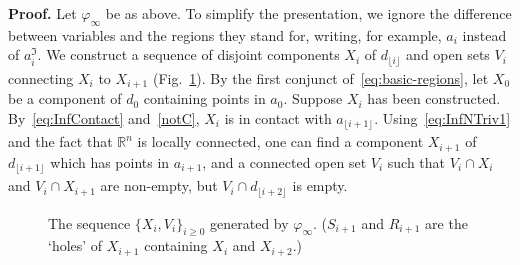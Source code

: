 \documentclass{article}
\newcommand{\R}{\mathbb{R}}
\newcommand{\md}[2][] {{\lfloor#2\rfloor_{#1}}}
\newcommand{\qedsymbol}{\ding{113}}
\newenvironment{proof}{\par\noindent\textbf{Proof.}}{\mbox{}\hfill\qedsymbol\par\bigskip}
\renewcommand{\phi}{\varphi}
\begin{document}
\begin{proof}
Let $\phi_\infty$ be as above.
To simplify the presentation, we ignore the difference between variables
and the regions they stand for, writing, for example, $a_i$ instead of
$a_i^\mathfrak{I}$.  We construct a sequence of disjoint components
$X_i$ of $d_{\md{i}}$ and open sets $V_i$ connecting $X_i$ to
$X_{i+1}$ (Fig.~\ref{fig:InfCmpConstr}). By the first conjunct
of~\eqref{eq:basic-regions}, let $X_0$ be a component of $d_0$
containing points in $a_0$. Suppose $X_i$ has been constructed.
By~\eqref{eq:InfContact} and~\eqref{notC}, $X_i$ is in contact with
$a_{\md{i+1}}$. Using~\eqref{eq:InfNTriv1} and the fact that
$\R^n$ is locally connected, one can find a
component $X_{i+1}$ of $d_{\md{i+1}}$ which has points in $a_{i+1}$,
and a connected open set $V_i$ such that $V_i \cap X_i$ and $V_i \cap
X_{i+1}$ are non-empty, but $V_i \cap d_{\md{i+2}}$ is empty.
\begin{figure}[h]
\begin{center}
\end{center}
\vspace*{-2mm}
\caption{The sequence $\{X_i,V_i\}_{i\geq0}$ generated by $\phi_\infty$.
($S_{i+1}$ and $R_{i+1}$ are the `holes' of $X_{i+1}$ containing $X_i$ and $X_{i+2}$.)
}
\label{fig:InfCmpConstr}
\end{figure}



\end{proof}
\end{document}
